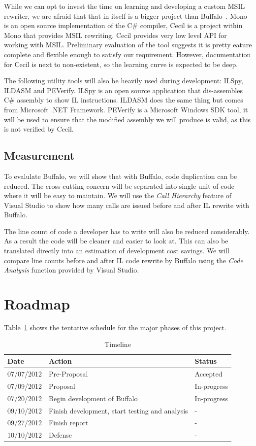 While we can opt to invest the time on learning and developing a custom MSIL rewriter, we are afraid that that in itself is a bigger project than Buffalo~\cite{msil_text}. Mono is an open source implementation of the C\# compiler, Cecil is a project within Mono that provides MSIL rewriting. Cecil provides very low level API for working with MSIL. Preliminary evaluation of the tool suggests it is pretty eature complete and flexible enough to satisfy our requirement. However, documentation for Cecil is next to non-existent, so the learning curve is expected to be deep.

The following utility tools will also be heavily used during development: ILSpy, ILDASM and PEVerify. ILSpy is an open source application that dis-assembles C\# assembly to show IL instructions. ILDASM does the same thing but comes from Microsoft .NET Framework. PEVerify is a Microsoft Windows SDK tool, it will be used to ensure that the modified assembly we will produce is valid, as this is not verified by Cecil.

\subsection{Measurement}
To evalulate Buffalo, we will show that with Buffalo, code duplication can be reduced. The cross-cutting concern will be separated into single unit of code where it will be easy to maintain. We will use the {\em Call Hierarchy} feature of Visual Studio to show how many calls are issued before and after IL rewrite with Buffalo. 

The line count of code a developer has to write will also be reduced considerably. As a result the code will be cleaner and easier to look at. This can also be translated directly into an estimation of development cost savings. We will compare line counts before and after IL code rewrite by Buffalo using the {\em Code Analysis} function provided by Visual Studio.

\section{Roadmap}
Table~\ref{tab:roadmap_tbl} shows the tentative schedule for the major phases of this project.

\begin{table}[H]
\centering
\begin{tabular}{|l|l|l|}
\hline
Date & Action & Status\\
\hline
07/07/2012 & Pre-Proposal & Accepted\\
07/09/2012 & Proposal & In-progress\\
07/20/2012 & Begin development of Buffalo & In-progress\\
09/10/2012 & Finish development, start testing and analysis & - \\
09/27/2012 & Finish report & - \\
10/10/2012 & Defense & - \\
\hline
\end{tabular}
\caption{Timeline}
\label{tab:roadmap_tbl}
\end{table}

